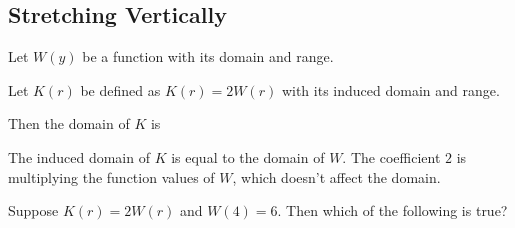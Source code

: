 \documentclass{ximera}
\begin{document}
\subsection*{Stretching Vertically}











Let $W(y)$ be a function with its domain and range.

Let $K(r)$ be defined as $K(r) = 2 W(r)$ with its induced domain and range.


Then the domain of $K$ is

\begin{multipleChoice}
\end{multipleChoice}

The induced domain of $K$ is equal to the domain of $W$.  The coefficient $2$ is multiplying the function values of $W$, which doesn't affect the domain.



\begin{question}


Suppose $K(r) = 2 W(r)$ and $W(4) = 6$.  Then which of the following is true?

\begin{multipleChoice}
\end{multipleChoice}


\end{question}
\end{document}
